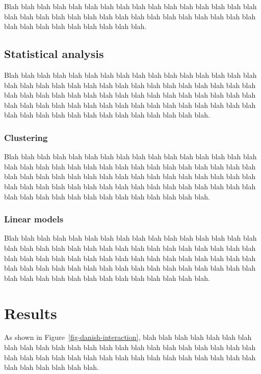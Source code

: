 \documentclass[
  a4paper,
]{scrbook}
\begin{document}
Blah blah blah blah blah blah blah blah blah blah blah blah blah blah
blah blah blah blah blah blah blah blah blah blah blah blah blah blah
blah blah blah blah blah blah blah blah blah blah blah blah blah.

\section{Statistical analysis}\label{statistical-analysis}

Blah blah blah blah blah blah blah blah blah blah blah blah blah blah
blah blah blah blah blah blah blah blah blah blah blah blah blah blah
blah blah blah blah blah blah blah blah blah blah blah blah blah blah
blah blah blah blah blah blah blah blah blah blah blah blah blah blah
blah blah blah blah blah blah blah blah blah blah blah blah blah blah
blah blah blah blah blah blah blah.

\subsection{Clustering}\label{clustering}

Blah blah blah blah blah blah blah blah blah blah blah blah blah blah
blah blah blah blah blah blah blah blah blah blah blah blah blah blah
blah blah blah blah blah blah blah blah blah blah blah blah blah blah
blah blah blah blah blah blah blah blah blah blah blah blah blah blah
blah blah blah blah blah blah blah blah blah blah blah blah blah blah
blah blah blah blah blah blah blah.

\subsection{Linear models}\label{linear-models}

Blah blah blah blah blah blah blah blah blah blah blah blah blah blah
blah blah blah blah blah blah blah blah blah blah blah blah blah blah
blah blah blah blah blah blah blah blah blah blah blah blah blah blah
blah blah blah blah blah blah blah blah blah blah blah blah blah blah
blah blah blah blah blah blah blah blah blah blah blah blah blah blah
blah blah blah blah blah blah blah.

\chapter{Results}\label{results}

As shown in Figure~\ref{fig-danish-interaction}, blah blah blah blah
blah blah blah blah blah blah blah blah blah blah blah blah blah blah
blah blah blah blah blah blah blah blah blah blah blah blah blah blah
blah blah blah blah blah blah blah blah blah blah blah blah blah.
\end{document}
